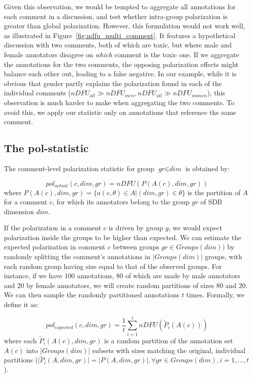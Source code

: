 \documentclass{article}
\newcommand{\sdbdim}{\textit{dim}}
\newcommand{\sdbgroup}{\textit{gr}}
\newcommand{\Sdbgroup}{\textit{Groups}}
\begin{document}
 Given this observation, we would be tempted to aggregate all annotations for each comment in a discussion, and test whether intra-group polarization is greater than global polarization. However, this formulation would not work well, as illustrated in  Figure~\ref{fig:ndfu_multi_comment}. It features a hypothetical discussion with two comments, both of which are toxic, but where male and female annotators disagree on \emph{which} comment is the toxic one. If we aggregate the annotations for the two comments, the opposing polarization effects might balance each other out, leading to a false negative. In our example, while it is obvious that gender partly explains the polarization found in each of the individual comments ($nDFU_{all} \gg nDFU_{men}, nDFU_{all} \gg nDFU_{women}$), this observation is much harder to make when aggregating the two comments. To avoid this, we apply our statistic only on annotations that reference the same comment. 
 
 \subsection{The pol-statistic}
  
 The comment-level polarization statistic for group $\sdbgroup \in \sdbdim$ is obtained by:
 
 \begin{equation}
 	pol_{actual}(c, \sdbdim, \sdbgroup) = nDFU(P(A(c), \sdbdim, \sdbgroup))
 \end{equation}
 \noindent where $P(A(c),\sdbdim, \sdbgroup) = \{a(c, \theta) \in A | (\sdbdim, \sdbgroup) \in \theta\}$ is the partition of $A$ for a comment $c$, for which its annotators belong  to the group $\sdbgroup$ of \ac{SDB} dimension $\sdbdim$.
 
 If the polarization in a comment $c$ is driven by group $g$, we would expect polarization inside the groups to be higher than expected. We can estimate the expected polarization in comment $c$ between groups $\sdbgroup \in \Sdbgroup(\sdbdim))$ by randomly splitting the comment's annotations in $\lvert \Sdbgroup(\sdbdim) \rvert$ groups, with each random group having size equal to that of the observed groups. For instance, if we have $100$ annotations, $80$ of which are made by male annotators and $20$ by female annotators, we will create random partitions of sizes $80$ and $20$. We can then sample the randomly partitioned annotations $t$ times. Formally, we define it as:
 
 \begin{equation}
 	\label{eq:pol_expected}
 	pol_{expected}(c, \sdbdim, \sdbgroup) = \frac{1}{t} \sum_{i=1}^t  nDFU(\tilde{P}_i(A(c)))
 \end{equation}
 \noindent where each $\tilde{P}_i(A(c), \sdbdim, \sdbgroup)$ is a random partition of the annotation set $A(c)$ into $\lvert \Sdbgroup(\sdbdim) \rvert$ subsets with sizes matching the original, individual partitions ($\lvert \tilde{P}_i(A, \sdbdim, \sdbgroup) \rvert = \lvert P(A, \sdbdim, \sdbgroup) \rvert, \forall \sdbgroup \in \Sdbgroup(\sdbdim) , i=1, \ldots, t$).
 
\end{document}
